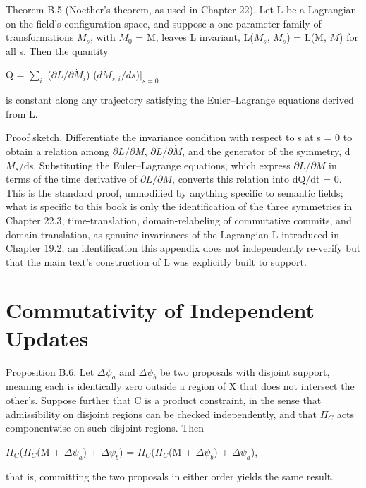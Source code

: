 Theorem B.5 (Noether's theorem, as used in Chapter 22). Let L be a Lagrangian on the field's configuration space, and suppose a one-parameter family of transformations \(M_s\), with \(M_0\) = M, leaves L invariant, L(\(M_s\), \(\dot{M}_s\)) = L(M, \(\dot{M}\)) for all s. Then the quantity

Q = \(\textstyle\sum_i\) (\(\partial L/\partial \dot{M}_i\)) (\(dM_{s,i}/ds\))\(\big|_{s=0}\)

is constant along any trajectory satisfying the Euler–Lagrange equations derived from L.

Proof sketch. Differentiate the invariance condition with respect to s at s = 0 to obtain a relation among \(\partial L/\partial M\), \(\partial L/\partial \dot{M}\), and the generator of the symmetry, d\(M_s\)/ds. Substituting the Euler–Lagrange equations, which express \(\partial L/\partial M\) in terms of the time derivative of \(\partial L/\partial \dot{M}\), converts this relation into dQ/dt = 0. This is the standard proof, unmodified by anything specific to semantic fields; what is specific to this book is only the identification of the three symmetries in Chapter 22.3, time-translation, domain-relabeling of commutative commits, and domain-translation, as genuine invariances of the Lagrangian L introduced in Chapter 19.2, an identification this appendix does not independently re-verify but that the main text's construction of L was explicitly built to support.

\section{Commutativity of Independent Updates}

Proposition B.6. Let \(\Delta\psi_a\) and \(\Delta\psi_b\) be two proposals with disjoint support, meaning each is identically zero outside a region of X that does not intersect the other's. Suppose further that C is a product constraint, in the sense that admissibility on disjoint regions can be checked independently, and that \(\Pi_C\) acts componentwise on such disjoint regions. Then

\(\Pi_C\)(\(\Pi_C\)(M + \(\Delta\psi_a\)) + \(\Delta\psi_b\)) = \(\Pi_C\)(\(\Pi_C\)(M + \(\Delta\psi_b\)) + \(\Delta\psi_a\)),

that is, committing the two proposals in either order yields the same result.

